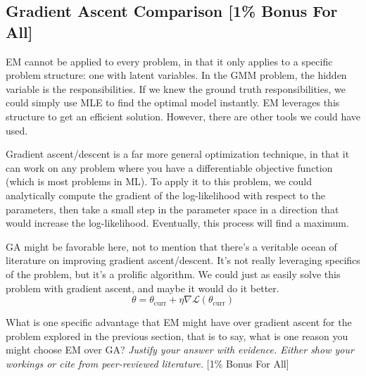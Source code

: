 \subsection{Gradient Ascent Comparison [1\% Bonus For All]}

EM cannot be applied to every problem, in that it only applies to a specific problem structure: one with latent variables. In the GMM problem, the hidden variable is the responsibilities. If we knew the ground truth responsibilities, we could simply use MLE to find the optimal model instantly. EM leverages this structure to get an efficient solution. However, there are other tools we could have used.

\smallskip Gradient ascent/descent is a far more general optimization technique, in that it can work on any problem where you have a differentiable objective function (which is most problems in ML). To apply it to this problem, we could analytically compute the gradient of the log-likelihood with respect to the parameters, then take a small step in the parameter space in a direction that would increase the log-likelihood. Eventually, this process will find a maximum.

\smallskip GA might be favorable here, not to mention that there's a veritable ocean of literature on improving gradient ascent/descent. It's not really leveraging specifics of the problem, but it's a prolific algorithm. We could just as easily solve this problem with gradient ascent, and maybe it would do it better.
$$\theta = \theta_{\text{curr}} + \eta\nabla \mathcal{L}(\theta_{\text{curr}})$$

\bigskip What is one specific advantage that EM might have over gradient ascent for the problem explored in the previous section, that is to say, what is one reason you might choose EM over GA? \emph{Justify your answer with evidence. Either show your workings or cite from peer-reviewed literature.} [1\% Bonus For All]
\newpage

